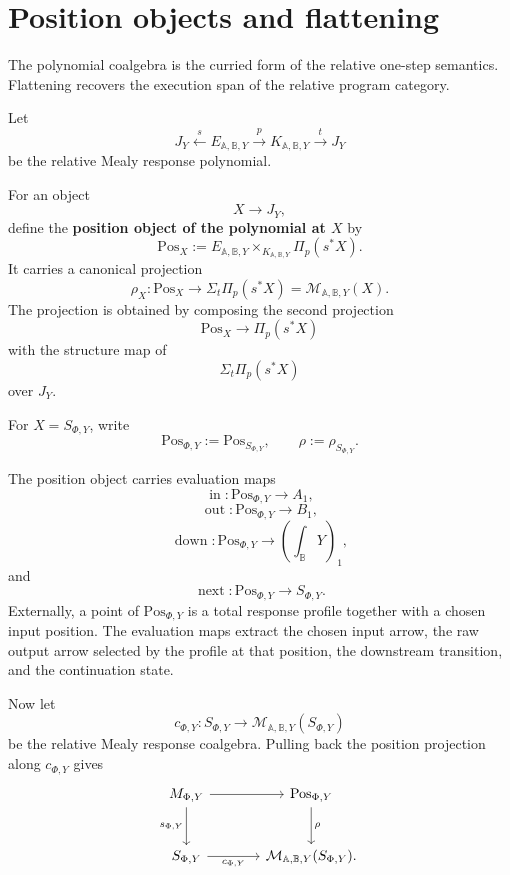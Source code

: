 \section{Position objects and flattening}
\label{sec:poly-relative-position-objects-flattening}

The polynomial coalgebra is the curried form of the relative one-step
semantics.  Flattening recovers the execution span of the relative program
category.

Let
\[
J_Y
\xleftarrow{s}
E_{\mathbb A,\mathbb B,Y}
\xrightarrow{p}
K_{\mathbb A,\mathbb B,Y}
\xrightarrow{t}
J_Y
\]
be the relative Mealy response polynomial.

For an object
\[
X\to J_Y,
\]
define the \textbf{position object of the polynomial at \(X\)} by
\[
\mathrm{Pos}_X
:=
E_{\mathbb A,\mathbb B,Y}
\times_{K_{\mathbb A,\mathbb B,Y}}
\Pi_p(s^\ast X).
\]
It carries a canonical projection
\[
\rho_X:\mathrm{Pos}_X\to
\Sigma_t\Pi_p(s^\ast X)
=
\mathcal M_{\mathbb A,\mathbb B,Y}(X).
\]
The projection is obtained by composing the second projection
\[
\mathrm{Pos}_X\to\Pi_p(s^\ast X)
\]
with the structure map of
\[
\Sigma_t\Pi_p(s^\ast X)
\]
over \(J_Y\).

For \(X=S_{\Phi,Y}\), write
\[
\mathrm{Pos}_{\Phi,Y}:=\mathrm{Pos}_{S_{\Phi,Y}},
\qquad
\rho:=\rho_{S_{\Phi,Y}}.
\]

The position object carries evaluation maps
\[
\operatorname{in}:\mathrm{Pos}_{\Phi,Y}\to A_1,
\]
\[
\operatorname{out}:\mathrm{Pos}_{\Phi,Y}\to B_1,
\]
\[
\operatorname{down}:\mathrm{Pos}_{\Phi,Y}\to
\left(\int_{\mathbb B}Y\right)_1,
\]
and
\[
\operatorname{next}:\mathrm{Pos}_{\Phi,Y}\to S_{\Phi,Y}.
\]
Externally, a point of \(\mathrm{Pos}_{\Phi,Y}\) is a total response profile
together with a chosen input position.  The evaluation maps extract the chosen
input arrow, the raw output arrow selected by the profile at that position, the
downstream transition, and the continuation state.

Now let
\[
c_{\Phi,Y}:
S_{\Phi,Y}\to
\mathcal M_{\mathbb A,\mathbb B,Y}(S_{\Phi,Y})
\]
be the relative Mealy response coalgebra.  Pulling back the position projection
along \(c_{\Phi,Y}\) gives
\[
\begin{tikzcd}[column sep=large,row sep=large]
M_{\Phi,Y}
  \arrow[r]
  \arrow[d, "s_{\Phi,Y}"']
&
\mathrm{Pos}_{\Phi,Y}
  \arrow[d, "\rho"]
\\
S_{\Phi,Y}
  \arrow[r, "c_{\Phi,Y}"']
&
\mathcal M_{\mathbb A,\mathbb B,Y}(S_{\Phi,Y}) .
\end{tikzcd}
\]

